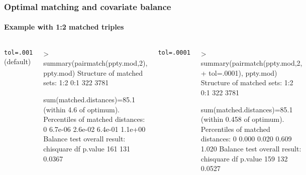 
\begin{frame}[fragile] \frametitle{Optimal matching and covariate balance}

\framesubtitle{Example with 1:2 matched triples}

\begin{columns}
{
  \begin{center}
    { \texttt{tol=.001} (default)}
  \end{center}
{\footnotesize
\begin{semiverbatim}
> summary(pairmatch(ppty.mod,2),
ppty.mod)
Structure of matched sets:
 1:2  0:1
 322 3781

sum(matched.distances)=85.1
(within 4.6 of optimum).
Percentiles of matched distances:
     0%
6.7e-06 2.6e-02 6.4e-01 1.1e+00
Balance test overall result:
  chisquare  df p.value
        161 131  0.0367
\end{semiverbatim}
}
}
{
  \begin{center}
    { \texttt{tol=.0001}}
  \end{center}
{\footnotesize
\begin{semiverbatim}
> summary(pairmatch(ppty.mod,2,
+ tol=.0001), ppty.mod)
Structure of matched sets:
 1:2  0:1
 322 3781

sum(matched.distances)=85.1
(within 0.458 of optimum).
Percentiles of matched distances:
   0%
0.000 0.020 0.609 1.020
Balance test overall result:
  chisquare  df p.value
        159 132  0.0527
\end{semiverbatim}
}
}
\end{columns}


\end{frame}




\begin{frame}



{\scriptsize

}
\end{frame}


